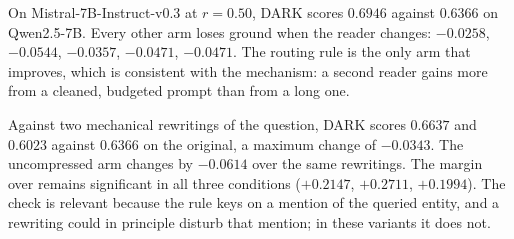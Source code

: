 On Mistral-7B-Instruct-v0.3 at $r=0.50$, \textsc{DARK} scores $0.6946$ against $0.6366$
on Qwen2.5-7B. Every other arm loses ground when the reader changes:  $-0.0258$,
 $-0.0544$,  $-0.0357$,  $-0.0471$,
 $-0.0471$. The routing rule is the only arm that improves, which
is consistent with the mechanism: a second reader gains more from a cleaned, budgeted prompt
than from a long one.

Against two mechanical rewritings of the question, \textsc{DARK} scores $0.6637$ and
$0.6023$ against $0.6366$ on the original, a maximum change of $-0.0343$. The uncompressed
arm changes by $-0.0614$ over the same rewritings. The margin over
 remains significant in all three conditions ($+0.2147$, $+0.2711$,
$+0.1994$). The check is relevant because the rule keys on a mention of the queried entity,
and a rewriting could in principle disturb that mention; in these variants it does not.
